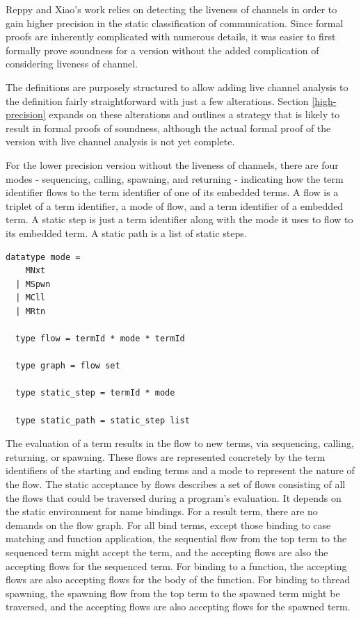 \documentclass[letterpaper, 11pt]{extarticle}
\begin{document}
Reppy and Xiao's work relies on detecting the liveness of channels in order to gain higher
precision in the static classification of communication. Since formal proofs are inherently
complicated with numerous details, it was easier to first formally prove soundness for a
version without the added complication of considering liveness of channel.

The definitions are purposely structured to allow adding live channel analysis to the
definition fairly straightforward with just a few alterations. Section \ref{high-precision} expands on
these alterations and outlines a strategy that is likely to result in formal proofs of
soundness, although the actual formal proof of the version with live channel analysis is
not yet complete.  

For the lower precision version without the liveness of channels, there are four modes -
sequencing, calling, spawning, and returning -
indicating how the term identifier flows to the term identifier of one of its embedded terms.
A flow is a triplet of a term identifier, a mode of flow, and a term identifier of a
embedded term. A static step is just a term identifier along with the mode it uses to
flow to its embedded term. A static path is a list of static steps.  

\begin{lstlisting}[language=logic, mathescape]
  datatype mode =
    MNxt
  | MSpwn
  | MCll
  | MRtn

  type flow = termId * mode * termId

  type graph = flow set

  type static_step = termId * mode

  type static_path = static_step list
\end{lstlisting}

The evaluation of a term results in the flow to new terms,
via sequencing, calling, returning, or spawning.  These flows are represented concretely
by the term identifiers of the starting and ending terms and a mode
to represent the nature of the flow.
The static acceptance by flows describes a set of flows consisting of all the flows
that could be traversed during a program's evaluation.
It depends on the static environment for name bindings.
For a result term, there are no demands on the flow graph.  For all bind terms, except those binding
to case matching and function application, the sequential flow from the top term to
the sequenced term might accept the term, and the accepting flows are also the
accepting flows for the sequenced term.  For binding to a function, the
accepting flows are also accepting flows for the body of the function.
For binding to thread spawning, the spawning flow from the top term
to the spawned term might be traversed, and the accepting flows are also
accepting flows for the spawned term.
\end{document}
